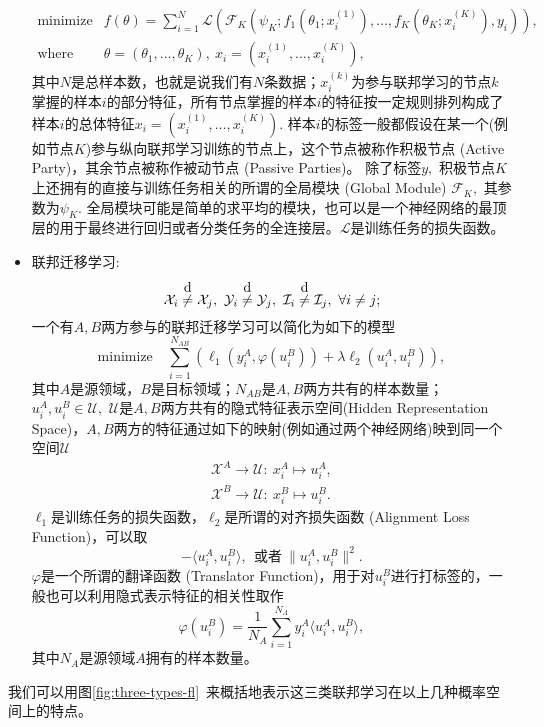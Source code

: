 \begin{itemize}
\begin{equation}
\begin{array}{cl}
\text{minimize} & f(\theta) = \sum\limits_{i=1}^N \mathcal{L} \left( \mathcal{F}_K \left( \psi_K; f_{1}(\theta_{1}; x_{i}^{(1)}), \ldots, f_{K}(\theta_{K}; x_{i}^{(K)}), y_{i} \right) \right), \\
\text{where} & \theta = (\theta_{1}, \ldots, \theta_{K}), ~ x_{i} = (x_{i}^{(1)}, \ldots, x_{i}^{(K)}),
\end{array}
\end{equation}
其中$N$是总样本数，也就是说我们有$N$条数据；$x_{i}^{(k)}$为参与联邦学习的节点$k$掌握的样本$i$的部分特征，所有节点掌握的样本$i$的特征按一定规则排列构成了样本$i$的总体特征$x_{i} = (x_{i}^{(1)}, \ldots, x_{i}^{(K)}).$ 样本$i$的标签一般都假设在某一个(例如节点$K$)参与纵向联邦学习训练的节点上，这个节点被称作积极节点 (Active Party)，其余节点被称作被动节点 (Passive Parties)。 除了标签$y,$ 积极节点$K$上还拥有的直接与训练任务相关的所谓的全局模块 (Global Module) $\mathcal{F}_K,$ 其参数为$\psi_K.$ 全局模块可能是简单的求平均的模块，也可以是一个神经网络的最顶层的用于最终进行回归或者分类任务的全连接层。$\mathcal{L}$是训练任务的损失函数。
\item 联邦迁移学习:
\begin{equation*}
\mathcal{X}_i \neqabove{d} \mathcal{X}_j, ~ \mathcal{Y}_i \neqabove{d} \mathcal{Y}_j, ~ \mathcal{I}_i \neqabove{d} \mathcal{I}_j, ~ \forall i \neq j;
\end{equation*}
一个有$A, B$两方参与的联邦迁移学习可以简化为如下的模型\cite{liu_2020_transfer_fl}
\begin{equation}
\label{eq:general-ftl}
\text{minimize} \quad \sum_{i=1}^{N_{AB}} \left( \ell_1(y_i^A, \varphi(u_i^B)) + \lambda \ell_2(u_i^A, u_i^B)  \right),
\end{equation}
其中$A$是源领域，$B$是目标领域；$N_{AB}$是$A, B$两方共有的样本数量；$u_i^A, u_i^B \in \mathcal{U},$ $\mathcal{U}$是$A, B$两方共有的隐式特征表示空间(Hidden Representation Space)，$A, B$两方的特征通过如下的映射(例如通过两个神经网络)映到同一个空间$\mathcal{U}$
\begin{gather*}
\mathcal{X}^A \to \mathcal{U}: ~ x_i^A \mapsto u_i^A, \\ \mathcal{X}^B \to \mathcal{U}: ~ x_i^B \mapsto u_i^B.
\end{gather*}
$\ell_1$是训练任务的损失函数，$\ell_2$是所谓的对齐损失函数 (Alignment Loss Function)，可以取
\begin{equation*}
- \langle u_i^A, u_i^B \rangle, ~~ \text{或者} ~ \lVert u_i^A, u_i^B \rVert^2.
\end{equation*}
$\varphi$是一个所谓的翻译函数 (Translator Function)，用于对$u_i^B$进行打标签的，一般也可以利用隐式表示特征的相关性取作
\begin{equation}
\label{eq:ftl-translator-func}
\varphi(u_i^B) = \frac{1}{N_A} \sum\limits_{i=1}^{N_A} y_i^A \langle u_i^A, u_i^B \rangle,
\end{equation}
其中$N_{A}$是源领域$A$拥有的样本数量。
\end{itemize}
我们可以用图\ref{fig:three-types-fl}~来概括地表示这三类联邦学习在以上几种概率空间上的特点。

